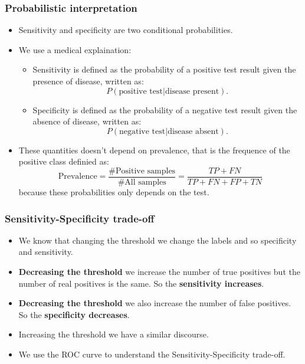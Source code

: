 \documentclass[9pt]{beamer}
\begin{document}
\begin{frame}
\frametitle{Probabilistic interpretation}
\begin{itemize}
\item Sensitivity and specificity are two conditional probabilities.
\item We use a medical explaination:
\begin{itemize}
\item Sensitivity is defined as the probability of a positive test result given the presence of disease, written as:
$$ P(\mbox{positive test} | \mbox{disease present}) .$$
\item Specificity is defined as the probability of a negative test result given the absence of disease, written as:
$$ P(\mbox{negative test} | \mbox{disease absent}) .$$
\end{itemize} 
\item These quantities doesn't depend on prevalence, that is the frequence of the positive class definied as:
$$
\mbox{Prevalence} =\dfrac{\# \mbox{Positive samples}}{\# \mbox{All samples}} =\dfrac{TP + FN}{ TP+FN+FP+TN}
$$
because these probabilities only depends on the test.
\end{itemize}
\end{frame}

\begin{frame}
\frametitle{Sensitivity-Specificity trade-off}
\begin{itemize}
\item We know that changing the threshold we change the labels and so specificity and sensitivity.
\item \textbf{Decreasing the threshold} we increase the number of true positives but the number of real positives is the same. So the \textbf{sensitivity increases}. 
\item \textbf{Decreasing the threshold} we also increase the number of false positives. So the \textbf{specificity decreases}.
\item Increasing the threshold we have a similar discourse.
\item We use the ROC curve to understand the Sensitivity-Specificity trade-off.
\end{itemize}
\end{frame}
\end{document}
